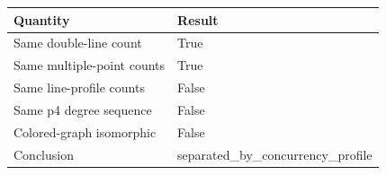 \begin{tabular}{@{}p{4.8cm}p{8.4cm}@{}}
\toprule
Quantity & Result \\
\midrule
Same double-line count & True \\
Same multiple-point counts & True \\
Same line-profile counts & False \\
Same p4 degree sequence & False \\
Colored-graph isomorphic & False \\
Conclusion & separated_by_concurrency_profile \\
\bottomrule
\end{tabular}
